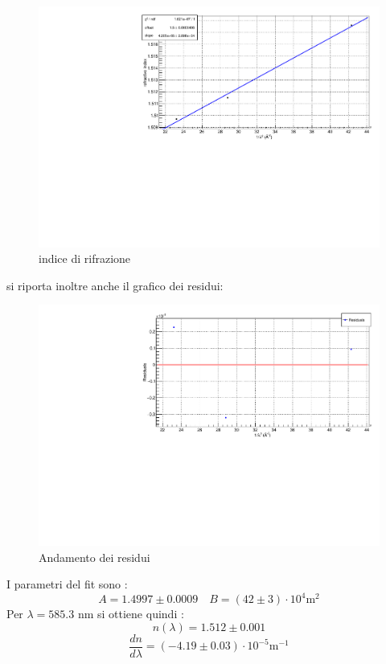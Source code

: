 \documentclass{article}
\begin{document}
\begin{center}
	\begin{figure}[ht]
		\centering
		\includegraphics[scale=0.38, angle=0]{nFit.pdf}
		\caption{ indice di rifrazione}
		\label{fig:nFit}
	\end{figure}
\end{center}

si riporta inoltre anche il grafico dei residui:
\begin{center}
	\begin{figure}[ht]
		\centering
		\includegraphics[scale=0.38, angle=0]{nFitRes.pdf}
		\caption{ Andamento dei residui}
		\label{fig:nFitRes}
	\end{figure}
\end{center}

	I parametri del fit sono :
	$$ A= 1.4997 \pm 0.0009 \quad B= (42 \pm 3 )\cdot 10^4 \text{m}^2$$
	Per $\lambda= 585.3$ nm si ottiene quindi :
	$$n(\lambda)= 1.512 \pm 0.001  $$
	$$  \frac{dn}{d\lambda} = (-4.19 \pm 0.03 )\cdot 10^{-5} \text{m}^{-1}$$
\end{document}
